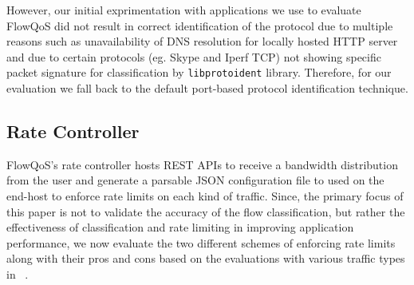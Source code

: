 However, our initial exprimentation with applications we use to evaluate FlowQoS did not result in correct identification of the protocol due to multiple reasons such as unavailability of DNS resolution for locally hosted HTTP server and due to certain protocols (eg. Skype and Iperf TCP) not showing specific packet signature for classification by \texttt{libprotoident} library. Therefore, for our evaluation we fall back to the default port-based protocol identification technique.

\subsection{Rate Controller}
FlowQoS's rate controller hosts REST APIs to receive a bandwidth distribution from the user and generate a parsable JSON configuration file to used on the end-host to enforce rate limits on each kind of traffic.
Since, the primary focus of this paper is not to validate the accuracy of the flow classification, but rather the effectiveness of classification and rate limiting in improving application performance, we now evaluate the two different schemes of enforcing rate limits along with their pros and cons based on the evaluations with various traffic types in ~.
